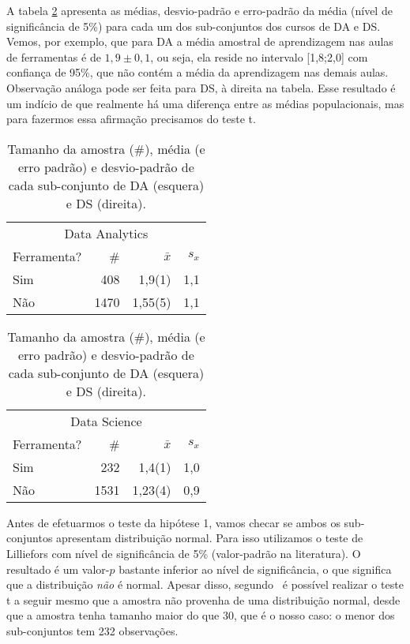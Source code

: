 A tabela \ref{tab:dist-hipotese-1} apresenta as médias, desvio-padrão e erro-padrão da média (nível de significância de 5\%) para cada um dos sub-conjuntos dos cursos de DA e DS.
Vemos, por exemplo, que para DA a média amostral de aprendizagem nas aulas de ferramentas é de $1,9\pm{0,1}$, ou seja, ela reside no intervalo [1,8;2,0] com confiança de 95\%, que não contém a média da aprendizagem nas demais aulas.
Observação análoga pode ser feita para DS, à direita na tabela.
Esse resultado é um indício de que realmente há uma diferença entre as médias populacionais, mas para fazermos essa afirmação precisamos do teste t.

\begin{table}
	\caption{Tamanho da amostra (\#), média (e erro padrão) e desvio-padrão de cada sub-conjunto de DA (esquera) e DS (direita).}
	\label{tab:dist-hipotese-1}
	\begin{minipage}{0.45\textwidth}
		\begin{tabular}{lrrr}
			\toprule
			\multicolumn{4}{c}{Data Analytics}\\
			Ferramenta? & \# & $\bar{x}$ & $s_x$ \\
			\midrule
			Sim &  408 & 1,9(1) & 1,1 \\
			Não & 1470 & 1,55(5) & 1,1 \\
			\bottomrule
		\end{tabular}
	\end{minipage}\hfill
	\begin{minipage}{0.45\textwidth}
		\begin{tabular}{lrrr}
			\toprule
			\multicolumn{4}{c}{Data Science}\\
			Ferramenta? & \# & $\bar{x}$ & $s_x$ \\
			\midrule
			Sim &  232 & 1,4(1) & 1,0 \\
			Não & 1531 & 1,23(4) & 0,9 \\
			\bottomrule
		\end{tabular}
	\end{minipage}
\end{table}

Antes de efetuarmos o teste da hipótese 1, vamos checar se ambos os sub-conjuntos apresentam distribuição normal.
Para isso utilizamos o teste de Lilliefors com nível de significância de 5\% (valor-padrão na literatura).
O resultado é um valor-$p$ bastante inferior ao nível de significância, o que significa que a distribuição \emph{não} é normal.
Apesar disso, segundo~\cite[p.~259]{Triola2005} é possível realizar o teste t a seguir mesmo que a amostra não provenha de uma distribuição normal, desde que a amostra tenha tamanho maior do que 30, que é o nosso caso: o menor dos sub-conjuntos tem 232 observações.

